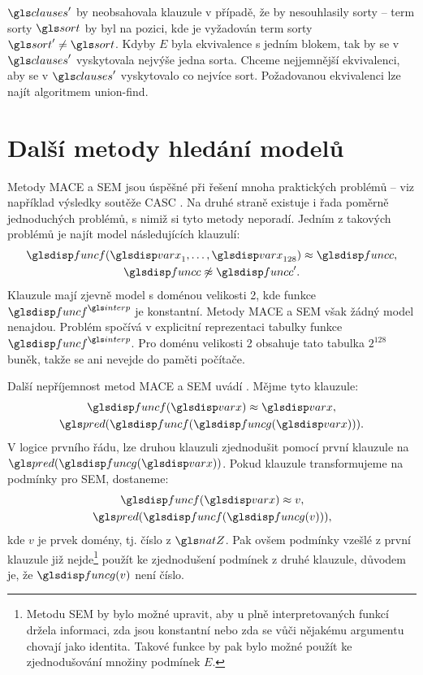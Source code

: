 $\clauses'$ by neobsahovala klauzule v případě, že by nesouhlasily
sorty -- term sorty $\sort$ by byl na pozici,
kde je vyžadován term sorty $\sort' \neq \sort$. Kdyby $E$ byla ekvivalence
s jedním blokem, tak by se v $\clauses'$ vyskytovala nejvýše jedna sorta.
Chceme nejjemnější ekvivalenci, aby se v $\clauses'$ vyskytovalo
co nejvíce sort. Požadovanou ekvivalenci lze najít algoritmem union-find.

\section{Další metody hledání modelů}

Metody MACE a SEM jsou úspěšné při řešení mnoha praktických problémů
-- viz například výsledky soutěže CASC \cite{sutcliffe2006casc}.
Na druhé straně existuje i řada poměrně jednoduchých problémů,
s nimiž si tyto metody neporadí. Jedním z takových problémů
je najít model následujících klauzulí:
\begin{gather*}
  \func(\var_1 \comdots \var_{128}) \approx \funcC, \\
  \funcC \not\approx \funcC'.
\end{gather*}
Klauzule mají zjevně model s doménou velikosti 2, kde funkce $\func^\interp$
je konstantní. Metody MACE a SEM však žádný model nenajdou.
Problém spočívá v explicitní reprezentaci tabulky funkce $\func^\interp$.
Pro doménu velikosti 2 obsahuje tato tabulka $2^{128}$ buněk,
takže se ani nevejde do paměti počítače.

Další nepříjemnost metod MACE a SEM uvádí \cite{hillenbrand2013superposition}.
Mějme tyto klauzule:
\begin{gather*}
\func(\var) \approx \var, \\
\pred(\func(\funcG(\var))).
\end{gather*}
V logice prvního řádu, lze
druhou klauzuli zjednodušit pomocí první klauzule na $\pred(\funcG(\var))$.
Pokud klauzule transformujeme na podmínky pro SEM, dostaneme:
\begin{gather*}
\func(\var) \approx v, \\
\pred(\func(\funcG(v))),
\end{gather*}
kde $v$ je prvek domény, tj. číslo z $\natZ$.
Pak ovšem podmínky vzešlé z první klauzule již nejde\footnote{Metodu
SEM by bylo možné upravit, aby u plně interpretovaných funkcí
držela informaci, zda jsou konstantní nebo zda
se vůči nějakému argumentu chovají jako identita.
Takové funkce by pak bylo možné použít ke zjednodušování množiny
podmínek $E$.}
použít ke zjednodušení podmínek z druhé klauzule, důvodem je, že
$\funcG(v)$ není číslo.


